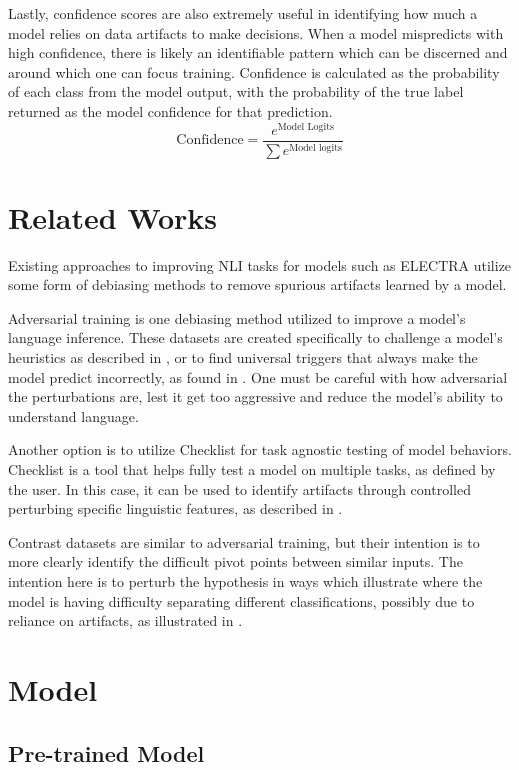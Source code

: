 \documentclass[11pt]{article}
\begin{document}
Lastly, confidence scores are also extremely useful in identifying how much a model relies on data artifacts to make decisions. When a model mispredicts with high confidence, there is likely an identifiable pattern which can be discerned and around which one can focus training. Confidence is calculated as the probability of each class from the model output, with the probability of the true label returned as the model confidence for that prediction.
\begin{equation*}
\text{Confidence} = \frac{e^{\text{Model Logits}}}{\sum e^{\text{Model logits}}}
\end{equation*}

\section{Related Works}
Existing approaches to improving NLI tasks for models such as ELECTRA utilize some form of debiasing methods to remove spurious artifacts learned by a model.

Adversarial training is one debiasing method utilized to improve a model's language inference. These datasets are created specifically to challenge a model's heuristics as described in \citealp{adversarial1}, or to find universal triggers that always make the model predict incorrectly, as found in \citealp{wallace2021universaladversarialtriggersattacking}. One must be careful with how adversarial the perturbations are, lest it get too aggressive and reduce the model's ability to understand language.

Another option is to utilize Checklist for task agnostic testing of model behaviors. Checklist is a tool that helps fully test a model on multiple tasks, as defined by the user. In this case, it can be used to identify artifacts through controlled perturbing specific linguistic features, as described in \citealp{checklist}.

Contrast datasets are similar to adversarial training, but their intention is to more clearly identify the difficult pivot points between similar inputs. The intention here is to perturb the hypothesis in ways which illustrate where the model is having difficulty separating different classifications, possibly due to reliance on artifacts, as illustrated in  \citealp{localdecisionboundaries}.

\section{Model}
\subsection{Pre-trained Model}
\end{document}
